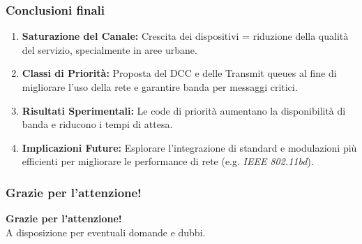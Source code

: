 \documentclass{beamer}
\begin{document}
\begin{frame}
    \frametitle{Conclusioni finali}

    \begin{enumerate}
        \vspace{5pt}
        \item \textbf{Saturazione del Canale:} Crescita dei dispositivi = riduzione della qualità del servizio, specialmente in aree urbane.
        \vspace{5pt}
        \item \textbf{Classi di Priorità:} Proposta del DCC e delle Transmit queues al fine di migliorare l'uso della rete e garantire banda per messaggi critici.
        \vspace{5pt}
        \item \textbf{Risultati Sperimentali:} Le code di priorità aumentano la disponibilità di banda e riducono i tempi di attesa.
        \vspace{5pt}
        \item \textbf{Implicazioni Future:} Esplorare l'integrazione di standard e modulazioni più efficienti per migliorare le performance di rete (e.g. \textit{IEEE 802.11bd}).
        \vspace{5pt}
    \end{enumerate}

\end{frame}

\begin{frame}
    \frametitle{Grazie per l'attenzione!}

    \begin{center}
        \textbf{Grazie per l'attenzione!} \\[1em]
        A disposizione per eventuali domande e dubbi.
    \end{center}

\end{frame}
\end{document}
